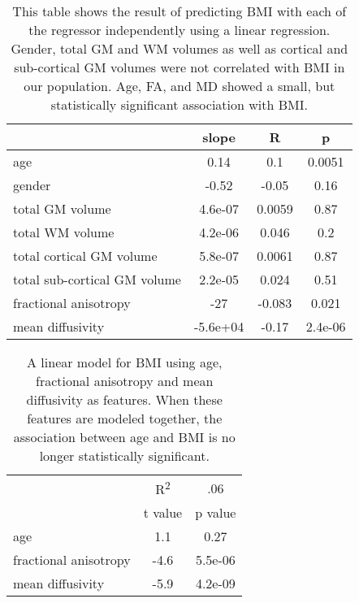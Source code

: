 \begin{table} 
    \begin{tabular}{l | c c c }
        & slope & R & p \\
        \hline
        age & 0.14 & 0.1 & 0.0051 \\
        gender & -0.52 & -0.05 & 0.16 \\
        total GM volume & 4.6e-07 & 0.0059 & 0.87 \\
        total WM volume & 4.2e-06 & 0.046 & 0.2 \\
        total cortical GM volume & 5.8e-07 & 0.0061 & 0.87 \\
        total sub-cortical GM volume & 2.2e-05 & 0.024 & 0.51 \\
        fractional anisotropy & -27 & -0.083 & 0.021 \\
        mean diffusivity & -5.6e+04 & -0.17 & 2.4e-06 \\
        \end{tabular} 
    \caption{\label{tab:basic} This table shows the result of predicting BMI with each of the regressor independently using a linear regression. Gender, total GM and WM volumes as well as cortical and sub-cortical GM volumes were not correlated with BMI in our population. Age, FA, and MD showed a small, but statistically significant association with BMI.} 
\end{table}

\begin{table} 
    \begin{tabular}{ l | c c }
        &R\textsuperscript{2} & .06 \\
        &t value & p value \\
        age & 1.1 & 0.27 \\
        fractional anisotropy & -4.6 & 5.5e-06 \\
        mean diffusivity & -5.9 & 4.2e-09 \\ 
    \end{tabular} 
    \caption{\label{tab:linearmodel} A linear model for BMI using age, fractional anisotropy and mean diffusivity as features. When these features are modeled together, the association between age and BMI is no longer statistically significant.} 
\end{table}